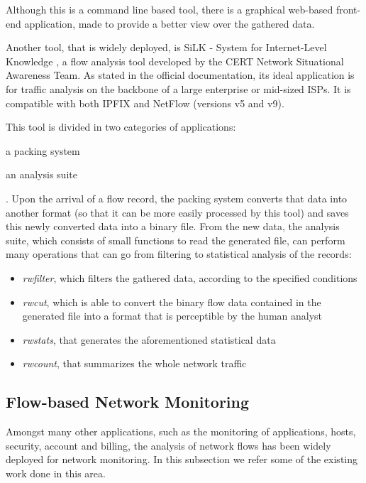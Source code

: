 \documentclass[runningheads,a4paper]{llncs}
\begin{document}
Although this is a command line based tool, there is a graphical web-based front-end application, made to provide a better view over the gathered data.


Another tool, that is widely deployed, is SiLK - System for Internet-Level Knowledge \cite{silk}, a flow analysis tool developed by the CERT Network Situational Awareness Team. As stated in the official documentation, its ideal application is for traffic analysis on the backbone of a large enterprise or mid-sized ISPs. It is compatible with both IPFIX and NetFlow (versions v5 and v9). 


This tool is divided in two categories of applications: 
\begin{enumerate*}
\item a packing system
\item an analysis suite
\end{enumerate*}. Upon the arrival of a flow record, the packing system converts that data into another format (so that it can be more easily processed by this tool) and saves this newly converted data into a binary file. From the new data, the analysis suite, which consists of small functions to read the generated file, can perform many operations that can go from filtering to statistical analysis of the records:
\begin{itemize}
\item \textit{rwfilter}, which filters the gathered data, according to the specified conditions
\item \textit{rwcut}, which is able to convert the binary flow data contained in the generated file into a format that is perceptible by the human analyst
\item \textit{rwstats}, that generates the aforementioned statistical data
\item \textit{rwcount}, that summarizes the whole network traffic
\end{itemize}


\subsection{Flow-based Network Monitoring}\label{ssec:monitor}
Amongst many other applications, such as the monitoring of applications, hosts, security, account and billing, the analysis of network flows has been widely deployed for network monitoring. In this subsection we refer some of the existing work done in this area.
\end{document}
